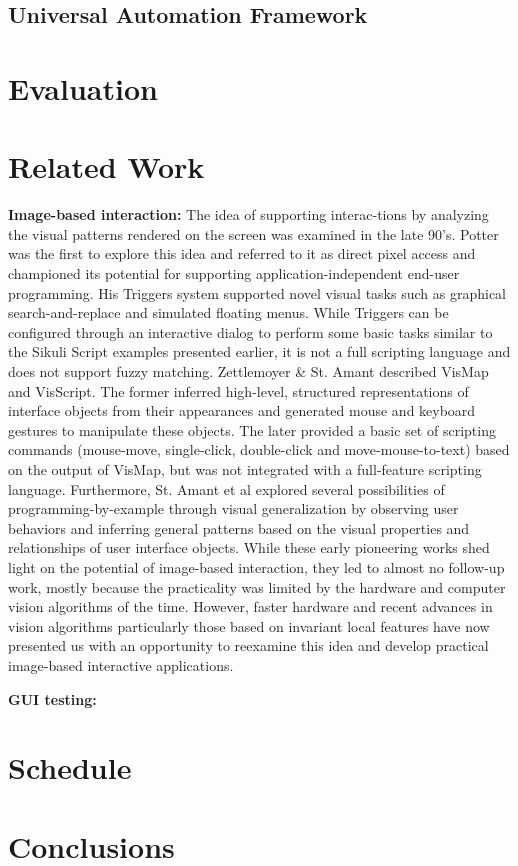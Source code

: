 \documentclass{chi2009}
\begin{document}
\subsection{Universal Automation Framework} 

\section{Evaluation}

\section{Related Work}
{\bf Image-based interaction:}
The idea of supporting interac-tions by analyzing the visual patterns 
rendered on the screen was examined in the late 90’s.  
Potter \cite{Potter99} was the
first to explore this idea and referred to it as direct pixel access and
championed its potential for supporting application-independent end-user
programming. His Triggers system supported novel visual tasks such as
graphical search-and-replace and simulated floating menus. While Triggers can
be configured through an interactive dialog to perform some basic tasks similar
to the Sikuli Script examples presented earlier, it is not a
full scripting language and does not support fuzzy matching. 
Zettlemoyer \& St. Amant \cite{zettlemoyer99}
described VisMap and VisScript. The former inferred high-level,
structured representations of interface objects from their appearances and
generated mouse and keyboard gestures to manipulate these objects. The later
provided a basic set of scripting commands (mouse-move, single-click,
double-click and move-mouse-to-text) based on the output of VisMap, but was not
integrated with a full-feature scripting language. 
Furthermore, St. Amant et al
\cite{amant00} explored several possibilities of programming-by-example 
through visual generalization by observing user behaviors and inferring general
patterns based on the visual properties and relationships of user interface
objects. While
these early pioneering works shed light on the potential of image-based
interaction, they led to almost no follow-up work, mostly because the
practicality was limited by the hardware and computer vision algorithms of the
time. However, faster hardware and recent advances in vision algorithms
particularly those based on invariant local features have now presented us with
an opportunity to reexamine this idea and develop practical image-based
interactive applications.

{\bf GUI testing:}


\section{Schedule}
\section{Conclusions}



\end{document}
